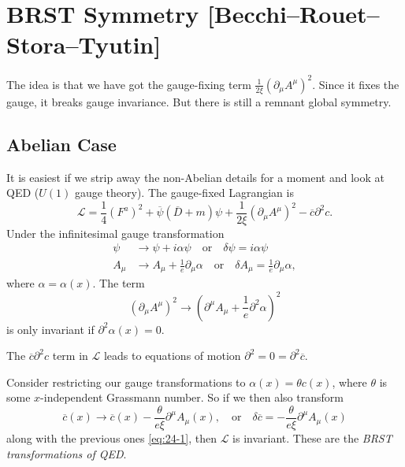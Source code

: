 
\section{BRST Symmetry [Becchi--Rouet--Stora--Tyutin]}%
\label{sec:brst_symmetry_becchi_rouet_stora_tyutin}

The idea is that we have got the gauge-fixing term $\frac{1}{2\xi} (\partial_{\mu} A^{\mu})^2$. Since it fixes the gauge, it breaks gauge invariance.
But there is still a remnant global symmetry.

\subsection{Abelian Case}%
\label{sub:abelian_case}

It is easiest if we strip away the non-Abelian details for a moment and look at QED ($U(1)$ gauge theory).
The gauge-fixed Lagrangian is
\begin{equation}
  \mathscr{L} = \frac{1}{4} (F^{a})^2 + \overline{\psi}{}(\overline{D}{} + m) \psi + \frac{1}{2 \xi} (\partial_{\mu} A^{\mu})^2 - \overline{c}{} \partial^2 c.
\end{equation}
Under the infinitesimal gauge transformation
\begin{subequations}
  \label{eq:24-1}
  \begin{align}
    \psi &\to \psi + i \alpha \psi \quad \text{or} \quad \delta \psi = i \alpha \psi \\
    A_{\mu} &\to A_{\mu} + \frac{1}{e} \partial_{\mu} \alpha \quad \text{or} \quad \delta A_{\mu} = \frac{1}{e} \partial_{\mu} \alpha,
  \end{align}
\end{subequations}
where $\alpha = \alpha(x)$. The term
\begin{equation}
  (\partial_{\mu} A^{\mu})^2 \to (\partial^{\mu} A_{\mu} + \frac{1}{e} \partial^2 \alpha)^2
\end{equation}
is only invariant if $\partial^2 \alpha(x) = 0$.
\begin{remark}
  The $\overline{c}{} \partial^2 c$ term in $\mathscr{L}$ leads to equations of motion $\partial^2 = 0 = \partial^2 \overline{c}{}$.
\end{remark}
Consider restricting our gauge transformations to $\alpha(x) = \theta c(x)$, where $\theta$ is some $x$-independent Grassmann number.  So if we then also transform
\begin{equation}
  \overline{c}{}(x) \to \overline{c}{}(x) - \frac{\theta}{e \xi} \partial^{\mu} A_{\mu}(x), \quad \text{or} \quad \delta \overline{c}{} = -\frac{\theta}{e \xi} \partial^{\mu} A_{\mu}(x)
\end{equation}
along with the previous ones \eqref{eq:24-1}, then $\mathscr{L}$ is invariant.
These are the \emph{BRST transformations of QED}.

